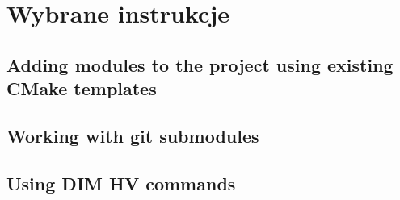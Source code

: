 \chapter{Wybrane instrukcje}
\label{cha:howtos}

\section{Adding modules to the project using existing CMake templates}
\section{Working with git submodules}
\section{Using DIM HV commands}